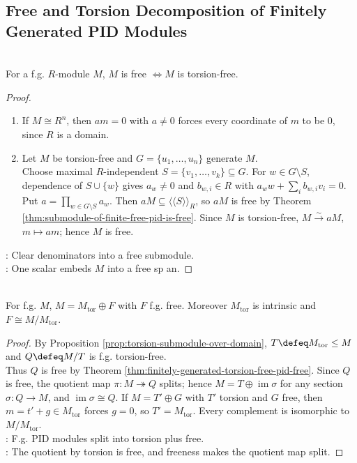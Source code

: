 \subsection{Free and Torsion Decomposition of Finitely Generated PID Modules}

\begin{theorem} \label{thm:finitely-generated-torsion-free-pid-free} \\
For a f.g. $R$-module $M$, $M$ is free $\iff M$ is torsion-free.
\begin{proof}
\begin{enumerate}[label=\roman*.]
\setlength{\itemsep}{0pt}
\item[$(\Rightarrow)$] If $M\cong R^n$, then $am=0$ with $a\neq0$ forces every coordinate of $m$ to be $0$, since $R$ is a domain.
\item[$(\Leftarrow)$] Let $M$ be torsion-free and $G=\{u_1,\ldots,u_n\}$ generate $M$.\\
Choose maximal $R$-independent $S=\{v_1,\ldots,v_k\}\subseteq G$. For $w\in G\setminus S$, dependence of $S\cup\{w\}$ gives $a_w\neq0$ and $b_{w,i}\in R$ with $a_ww+\sum\limits_i b_{w,i}v_i=0$. Put $a=\prod_{w\in G\setminus S}a_w$. Then $aM\subseteq\langle\!\langle S\rangle\!\rangle_R$, so $aM$ is free by Theorem \ref{thm:submodule-of-finite-free-pid-is-free}. Since $M$ is torsion-free, $M\xrightarrow{\sim}aM$, $m\mapsto am$; hence $M$ is free.
\end{enumerate}
\noindent
{}: Clear denominators into a free submodule.\\
: One scalar embeds $M$ into a free sp	an.
\end{proof}
\end{theorem}

\begin{theorem} \label{thm:finitely-generated-pid-free-plus-torsion} \\
For f.g. $M$, $M=M_{\operatorname{tor}}\oplus F$ with $F$ f.g. free. Moreover $M_{\operatorname{tor}}$ is intrinsic and $F\cong M/M_{\operatorname{tor}}$.
\begin{proof} By Proposition \ref{prop:torsion-submodule-over-domain}, $T\defeq M_{\operatorname{tor}}\leq M$ and $Q\defeq M/T$ is f.g. torsion-free.\\
Thus $Q$ is free by Theorem \ref{thm:finitely-generated-torsion-free-pid-free}. Since $Q$ is free, the quotient map $\pi:M\twoheadrightarrow Q$ splits; hence $M=T\oplus\operatorname{im}\sigma$ for any section $\sigma:Q\to M$, and $\operatorname{im}\sigma\cong Q$. If $M=T'\oplus G$ with $T'$ torsion and $G$ free, then $m=t'+g\in M_{\operatorname{tor}}$ forces $g=0$, so $T'=M_{\operatorname{tor}}$. Every complement is isomorphic to $M/M_{\operatorname{tor}}$.\\
: F.g. PID modules split into torsion plus free.\\
: The quotient by torsion is free, and freeness makes the quotient map split.
\end{proof}
\end{theorem}
